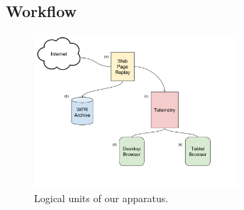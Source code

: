 \subsection{Workflow} \label{workflow}
\begin{figure}[t]
    \hspace{-10pt}
    \includegraphics[width=3in]{../images/methodology_workflow_diagram.pdf}
    \caption[]{\label{fig:workflow_diagram}Logical units of our apparatus.}
\end{figure}

